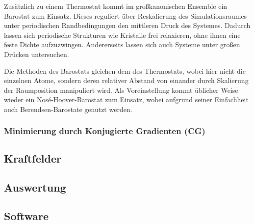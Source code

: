 Zusätzlich zu einem Thermostat kommt im großkanonischen Ensemble ein Barostat zum Einsatz.
Dieses reguliert über Reskalierung des Simulationsraumes unter periodischen Randbedingungen den mittleren Druck des Systemes.
Dadurch lassen sich periodische Strukturen wie Kristalle frei relaxieren, ohne ihnen eine feste Dichte aufzuzwingen.
Andererseits lassen sich auch Systeme unter großen Drücken untersuchen.

Die Methoden des Barostats gleichen dem des Thermostats, wobei hier nicht die einzelnen Atome, sondern deren relativer Abstand von einander durch Skalierung der Raumposition manipuliert wird.
Als Voreinstellung kommt üblicher Weise wieder ein Nosé-Hoover-Barostat zum Einsatz, wobei aufgrund seiner Einfachheit auch Berendsen-Barostate genutzt werden.


\subsubsection{Minimierung durch Konjugierte Gradienten (CG)}


\subsection{Kraftfelder}

\subsection{Auswertung}

\subsection{Software}

